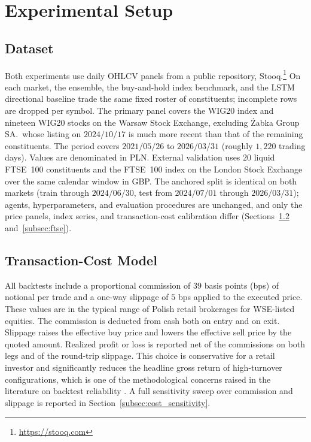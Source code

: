 \documentclass{ieeeaccess}
\newcommand{\FtseNsymbols}{\ensuremath{20}}
\begin{document}
\section{Experimental Setup}
\label{sec:setup}

\subsection{Dataset}
\label{subsec:dataset}

Both experiments use daily OHLCV panels from a public repository, Stooq.\footnote{\url{https://stooq.com}} On each market, the ensemble, the buy-and-hold index benchmark, and the LSTM directional baseline trade the same fixed roster of constituents; incomplete rows are dropped per symbol. The primary panel covers the WIG20 index and nineteen WIG20 stocks on the Warsaw Stock Exchange, excluding \.{Z}abka Group SA.\, whose listing on $2024/10/17$ is much more recent than that of the remaining constituents. The period covers $2021/05/26$ to $2026/03/31$ (roughly $1{,}220$ trading days). Values are denominated in PLN. External validation uses \FtseNsymbols{} liquid FTSE~100 constituents and the FTSE~100 index on the London Stock Exchange over the same calendar window in GBP. The anchored split is identical on both markets (train through $2024/06/30$, test from $2024/07/01$ through $2026/03/31$); agents, hyperparameters, and evaluation procedures are unchanged, and only the price panels, index series, and transaction-cost calibration differ (Sections~\ref{subsec:costs} and~\ref{subsec:ftse}).

\subsection{Transaction-Cost Model}
\label{subsec:costs}

All backtests include a proportional commission of $39$ basis points (bps) of notional per trade and a one-way slippage of $5$ bps applied to the executed price. These values are in the typical range of Polish retail brokerages for WSE-listed equities. The commission is deducted from cash both on entry and on exit. Slippage raises the effective buy price and lowers the effective sell price by the quoted amount. Realized profit or loss is reported net of the commissions on both legs and of the round-trip slippage. This choice is conservative for a retail investor and significantly reduces the headline gross return of high-turnover configurations, which is one of the methodological concerns raised in the literature on backtest reliability \cite{bailey2014}. A full sensitivity sweep over commission and slippage is reported in Section~\ref{subsec:cost_sensitivity}.
\end{document}
